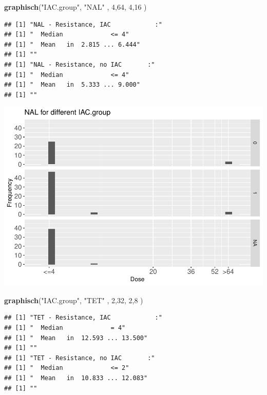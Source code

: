 \documentclass[
]{article}
\newenvironment{Shaded}{\begin{snugshade}}{\end{snugshade}}
\newcommand{\DecValTok}[1]{\textcolor[rgb]{0.00,0.00,0.81}{#1}}
\newcommand{\KeywordTok}[1]{\textcolor[rgb]{0.13,0.29,0.53}{\textbf{#1}}}
\newcommand{\NormalTok}[1]{#1}
\newcommand{\StringTok}[1]{\textcolor[rgb]{0.31,0.60,0.02}{#1}}
\begin{document}
\begin{Shaded}
\begin{Highlighting}[]
   \KeywordTok{graphisch}\NormalTok{(}\StringTok{"IAC.group"}\NormalTok{, }\StringTok{"NAL"}\NormalTok{ , }\DecValTok{4}\NormalTok{,}\DecValTok{64}\NormalTok{,   }\DecValTok{4}\NormalTok{,}\DecValTok{16}\NormalTok{    ) }
\end{Highlighting}
\end{Shaded}

\begin{verbatim}
## [1] "NAL - Resistance, IAC            :"
## [1] "  Median             <= 4"
## [1] "  Mean   in  2.815 ... 6.444"
## [1] ""
## [1] "NAL - Resistance, no IAC       :"
## [1] "  Median             <= 4"
## [1] "  Mean   in  5.333 ... 9.000"
## [1] ""
\end{verbatim}

\includegraphics{Verteilungen_files/figure-latex/unnamed-chunk-14-1.pdf}

\begin{Shaded}
\begin{Highlighting}[]
   \KeywordTok{graphisch}\NormalTok{(}\StringTok{"IAC.group"}\NormalTok{, }\StringTok{"TET"}\NormalTok{ , }\DecValTok{2}\NormalTok{,}\DecValTok{32}\NormalTok{,   }\DecValTok{2}\NormalTok{,}\DecValTok{8}\NormalTok{    ) }
\end{Highlighting}
\end{Shaded}

\begin{verbatim}
## [1] "TET - Resistance, IAC            :"
## [1] "  Median             = 4"
## [1] "  Mean   in  12.593 ... 13.500"
## [1] ""
## [1] "TET - Resistance, no IAC       :"
## [1] "  Median             <= 2"
## [1] "  Mean   in  10.833 ... 12.083"
## [1] ""
\end{verbatim}
\end{document}
